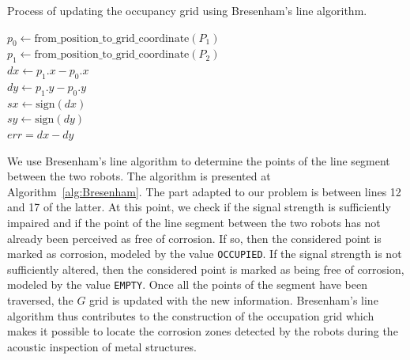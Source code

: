 \begin{algorithm}[h!]
	\caption{Process of updating the occupancy grid using Bresenham's line algorithm.}
	\label{alg:Bresenham}
	$p_0 \gets \text{from\_position\_to\_grid\_coordinate}(P_1)$ \\
	$p_1 \gets \text{from\_position\_to\_grid\_coordinate}(P_2)$ \\
	$dx \gets p_1.x - p_0.x$ \\
	$dy \gets p_1.y - p_0.y$ \\
	$sx \gets \text{sign}(dx)$ \\
	$sy \gets \text{sign}(dy)$ \\
	$err = dx - dy$ \\
\end{algorithm}

We use Bresenham's line algorithm to determine the points of the line segment between the two robots.
The algorithm is presented at Algorithm~\ref{alg:Bresenham}.
The part adapted to our problem is between lines 12 and 17 of the latter.
At this point, we check if the signal strength is sufficiently impaired and if the point of the line segment between the two robots has not already been perceived as free of corrosion.
If so, then the considered point is marked as corrosion, modeled by the value \texttt{OCCUPIED}.
If the signal strength is not sufficiently altered, then the considered point is marked as being free of corrosion, modeled by the value \texttt{EMPTY}.
Once all the points of the segment have been traversed, the $G$ grid is updated with the new information.
Bresenham's line algorithm thus contributes to the construction of the occupation grid which makes it possible to locate the corrosion zones detected by the robots during the acoustic inspection of metal structures.

